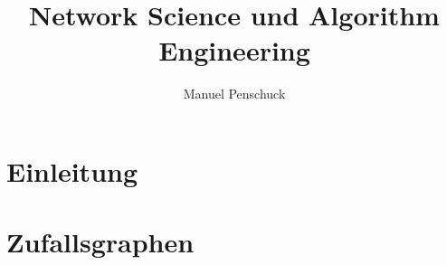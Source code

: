 \documentclass[%
	11pt,%
	german,%
]{book}
\title{Network Science und Algorithm Engineering}
\author{Manuel Penschuck}
\begin{document}
\maketitle

\clearpage

\tableofcontents

\chapter{Einleitung}

\chapter{Zufallsgraphen}


\cleardoublepage
{}
\fancyhead[RO]{}
\thispagestyle{fancy}
\pagestyle{fancy}

\small
\patchcmd{\thebibliography}{\chapter*}{\section*}{}{}

\end{document}
